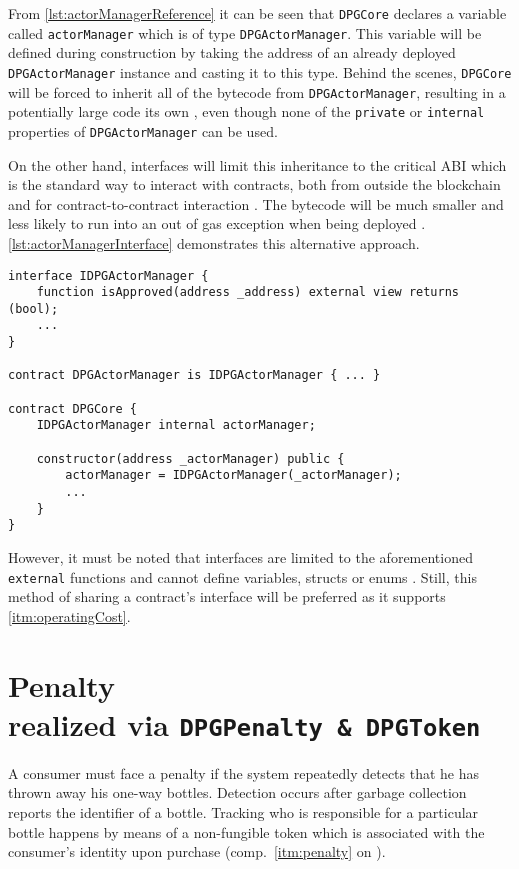 From \autoref{lst:actorManagerReference} it can be seen that \texttt{DPGCore} declares a variable called \texttt{actorManager} which is of type \texttt{DPGActorManager}. This variable will be defined during construction by taking the address of an already deployed \texttt{DPGActorManager} instance and casting it to this type. Behind the scenes, \texttt{DPGCore} will be forced to inherit all of the bytecode from \texttt{DPGActorManager}, resulting in a potentially large code its own \cite{interfaces}, even though none of the \texttt{private} or \texttt{internal} properties of \texttt{DPGActorManager} can be used. 

On the other hand, interfaces will limit this inheritance to the critical \ac{ABI} which is the standard way to interact with contracts, both from outside the blockchain and for contract-to-contract interaction \cite[pp.~93, 133]{solidityDocs}. The bytecode will be much smaller and less likely to run into an out of gas exception when being deployed \cite{interfaces}. \autoref{lst:actorManagerInterface} demonstrates this alternative approach. 

\pagebreak

\begin{lstlisting}[language=Solidity, caption=Sharing external contract interface via interfaces, label=lst:actorManagerInterface]
interface IDPGActorManager {
	function isApproved(address _address) external view returns (bool);
	...
}

contract DPGActorManager is IDPGActorManager { ... }

contract DPGCore {
	IDPGActorManager internal actorManager;
	
	constructor(address _actorManager) public {
		actorManager = IDPGActorManager(_actorManager);
		...
	}
}
\end{lstlisting}

However, it must be noted that interfaces are limited to the aforementioned \texttt{external} functions and cannot define variables, structs or enums \cite[p.~92]{solidityDocs}. Still, this method of sharing a contract's interface will be preferred as it supports \ref{itm:operatingCost}.

\pagebreak

\section[Penalty]{Penalty \\ {\normalsize realized via \texttt{DPGPenalty \& DPGToken}}}
A consumer must face a penalty if the system repeatedly detects that he has thrown away his one-way bottles. Detection occurs after garbage collection reports the identifier of a bottle. Tracking who is responsible for a particular bottle happens by means of a non-fungible token which is associated with the consumer's identity upon purchase (comp.~\ref{itm:penalty} on ).

